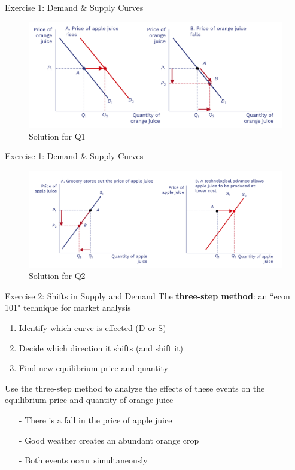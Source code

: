 \documentclass[9pt, handout]{beamer}
\begin{document}
\begin{frame}{Exercise 1: Demand \& Supply Curves}
    \begin{figure}
        \centering
        \includegraphics[width=0.9\linewidth]{fig1.png}
        \caption{Solution for Q1}
    \end{figure}
\end{frame}

\begin{frame}{Exercise 1: Demand \& Supply Curves}
    \begin{figure}
        \centering
        \includegraphics[width=0.9\linewidth]{fig2.png}
        \caption{Solution for Q2}
    \end{figure}
\end{frame}

\begin{frame}{Exercise 2: Shifts in Supply and Demand}
    The \textbf{three-step method}: an ``econ 101" technique for market analysis
    \begin{enumerate}
        \item Identify which curve is effected (D or S)
        \item Decide which direction it shifts (and shift it)
        \item Find new equilibrium price and quantity
    \end{enumerate}
    \vspace{25}
    Use the three-step method to analyze the effects of these events on the equilibrium price and quantity of orange juice
    \begin{itemize}
        \item[-] There is a fall in the price of apple juice
        \item[-] Good weather creates an abundant orange crop
        \item[-] Both events occur simultaneously
    \end{itemize}
    \vspace{2in}
\end{frame}
\end{document}
